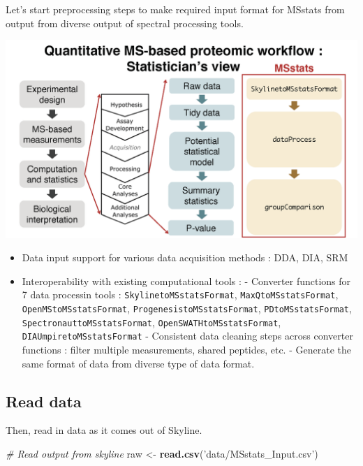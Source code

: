 \documentclass[]{book}
\newenvironment{Shaded}{\begin{snugshade}}{\end{snugshade}}
\newcommand{\CommentTok}[1]{\textcolor[rgb]{0.56,0.35,0.01}{\textit{#1}}}
\newcommand{\KeywordTok}[1]{\textcolor[rgb]{0.13,0.29,0.53}{\textbf{#1}}}
\newcommand{\NormalTok}[1]{#1}
\newcommand{\StringTok}[1]{\textcolor[rgb]{0.31,0.60,0.02}{#1}}
\begin{document}
Let's start preprocessing steps to make required input format for MSstats from output from diverse output of spectral processing tools.

\includegraphics{img/MSstats_intro4.png}

\begin{itemize}
\item
  Data input support for various data acquisition methods : DDA, DIA, SRM
\item
  Interoperability with existing computational tools :
  - Converter functions for 7 data processin tools :
  \texttt{SkylinetoMSstatsFormat}, \texttt{MaxQtoMSstatsFormat}, \texttt{OpenMStoMSstatsFormat}, \texttt{ProgenesistoMSstatsFormat}, \texttt{PDtoMSstatsFormat}, \texttt{SpectronauttoMSstatsFormat}, \texttt{OpenSWATHtoMSstatsFormat}, \texttt{DIAUmpiretoMSstatsFormat}
  - Consistent data cleaning steps across converter functions : filter multiple measurements, shared peptides, etc.
  - Generate the same format of data from diverse type of data format.
\end{itemize}

\hypertarget{read-data}{%
\subsection{Read data}\label{read-data}}

Then, read in data as it comes out of Skyline.

\begin{Shaded}
\begin{Highlighting}[]
\CommentTok{# Read output from skyline }
\NormalTok{raw <-}\StringTok{ }\KeywordTok{read.csv}\NormalTok{(}\StringTok{'data/MSstats_Input.csv'}\NormalTok{)}
\end{Highlighting}
\end{Shaded}
\end{document}
